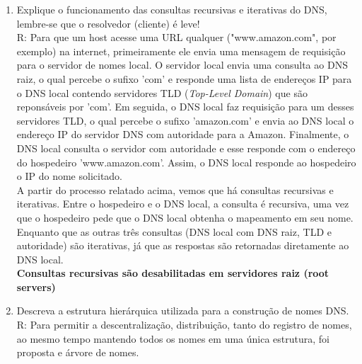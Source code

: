 \documentclass{article}
\begin{document}
\begin{enumerate}
	\item Explique o funcionamento das consultas recursivas e iterativas do DNS, lembre-se que o resolvedor (cliente) é leve!
	\\
	R: 
	Para que um host acesse uma URL qualquer ("www.amazon.com", por exemplo) na internet, primeiramente ele envia uma mensagem de requisição para o servidor de nomes local. O servidor local envia uma consulta ao DNS raiz, o qual percebe o sufixo 'com' e responde uma lista de endereços IP para o DNS local contendo servidores TLD (\textit{Top-Level Domain}) que são reponsáveis por 'com'. Em seguida, o DNS local faz requisição para um desses servidores TLD, o qual percebe o sufixo 'amazon.com' e envia ao DNS local o endereço IP do servidor DNS com autoridade para a Amazon. Finalmente, o DNS local consulta o servidor com autoridade e esse responde com o endereço do hospedeiro 'www.amazon.com'. Assim, o DNS local responde ao hospedeiro o IP do nome solicitado.
\\
A partir do processo relatado acima, vemos que há consultas recursivas e iterativas. Entre o hospedeiro e o DNS local, a consulta é recursiva, uma vez que o hospedeiro pede que o DNS local obtenha o mapeamento em seu nome. Enquanto que as outras três consultas (DNS local com DNS raiz, TLD e autoridade) são iterativas, já que as respostas são retornadas diretamente ao DNS local. 
\\
\textbf{Consultas recursivas são desabilitadas em servidores raiz (root servers)}
	
	

	\item Descreva a estrutura hierárquica utilizada para a construção de nomes DNS.
	\\
	R: 
	Para permitir a descentralização, distribuição, tanto do registro de nomes, ao mesmo tempo
mantendo todos os nomes em uma única estrutura, foi proposta e árvore de nomes.


\end{enumerate}
\end{document}
